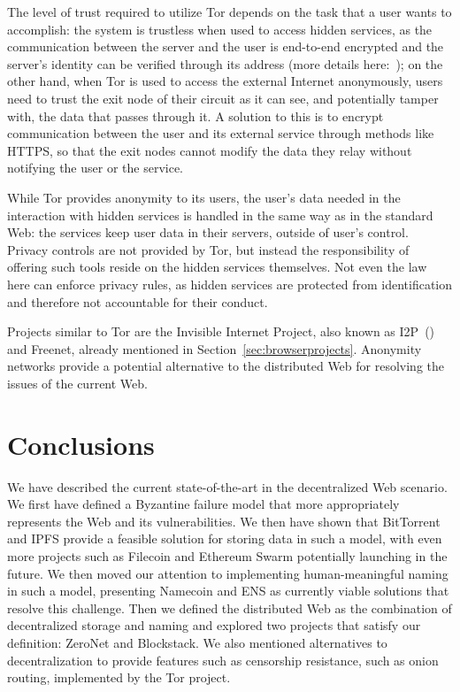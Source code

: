 \documentclass[mscthesis]{usiinfthesis}
\begin{document}
The level of trust required to utilize Tor depends on the task that a user wants to accomplish: the system is trustless when used to access hidden services, as the communication between the server and the user is end-to-end encrypted and the server's identity can be verified through its address (more details here:~\cite{website:torhiddenservice}); on the other hand, when Tor is used to access the external Internet anonymously, users need to trust the exit node of their circuit as it can see, and potentially tamper with, the data that passes through it. A solution to this is to encrypt communication between the user and its external service through methods like HTTPS, so that the exit nodes cannot modify the data they relay without notifying the user or the service.

While Tor provides anonymity to its users, the user's data needed in the interaction with hidden services is handled in the same way as in the standard Web: the services keep user data in their servers, outside of user's control. Privacy controls are not provided by Tor, but instead the responsibility of offering such tools reside on the hidden services themselves. Not even the law here can enforce privacy rules, as hidden services are protected from identification and therefore not accountable for their conduct.

Projects similar to Tor are the Invisible Internet Project, also known as I2P~(\cite{i2p}) and Freenet, already mentioned in Section~\ref{sec:browserprojects}. Anonymity networks provide a potential alternative to the distributed Web for resolving the issues of the current Web.

\chapter{Conclusions}\label{ch:conclusions}

We have described the current state-of-the-art in the decentralized Web scenario. We first have defined a Byzantine failure model that more appropriately represents the Web and its vulnerabilities. We then have shown that BitTorrent and IPFS provide a feasible solution for storing data in such a model, with even more projects such as Filecoin and Ethereum Swarm potentially launching in the future. We then moved our attention to implementing human-meaningful naming in such a model, presenting Namecoin and ENS as currently viable solutions that resolve this challenge. Then we defined the distributed Web as the combination of decentralized storage and naming and explored two projects that satisfy our definition: ZeroNet and Blockstack. We also mentioned alternatives to decentralization to provide features such as censorship resistance, such as onion routing, implemented by the Tor project.
\end{document}

